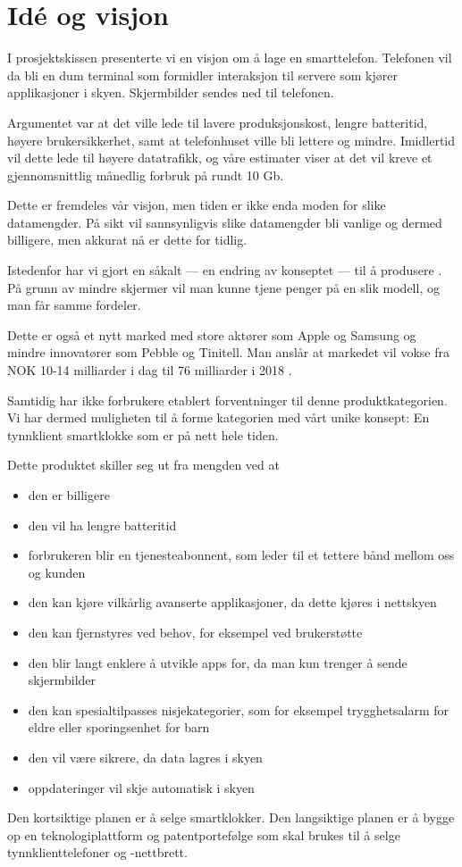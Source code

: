 \section{Idé og visjon}

I prosjektskissen presenterte vi en visjon om å lage en 
smarttelefon. Telefonen vil da bli en dum terminal som formidler interaksjon
til servere som kjører applikasjoner i skyen. Skjermbilder sendes ned til
telefonen.

Argumentet var at det ville lede til lavere produksjonskost, lengre
batteritid, høyere brukersikkerhet, samt at telefonhuset ville bli lettere og
mindre.  Imidlertid vil dette lede til høyere datatrafikk, og våre estimater
viser at det vil kreve et gjennomsnittlig månedlig forbruk på rundt 10 Gb.

Dette er fremdeles vår visjon, men tiden er ikke enda moden for slike
datamengder. På sikt vil sannsynligvis slike datamengder bli vanlige og dermed
billigere, men akkurat nå er dette for tidlig.

Istedenfor har vi gjort en såkalt  --- en endring av
konseptet --- til å produsere .  På grunn av
mindre skjermer vil man kunne tjene penger på en slik modell, og man får samme
fordeler.

Dette er også et nytt marked med store aktører som Apple og Samsung
og mindre innovatører som Pebble og Tinitell. Man anslår at markedet vil vokse
fra NOK 10-14 milliarder i dag til 76 milliarder i 2018 \cite{citi.grow}.

Samtidig har ikke forbrukere etablert forventninger til denne
produktkategorien. Vi har dermed muligheten til å forme kategorien med vårt
unike konsept: En tynnklient smartklokke som er på nett hele tiden.

Dette produktet skiller seg ut fra mengden ved at

\begin{itemize}
  \item den er billigere
  \item den vil ha lengre batteritid
  \item forbrukeren blir en tjenesteabonnent, som leder til et tettere bånd
  mellom oss og kunden
  \item den kan kjøre vilkårlig avanserte applikasjoner, da dette kjøres i
  nettskyen
  \item den kan fjernstyres ved behov, for eksempel ved brukerstøtte
  \item den blir langt enklere å utvikle apps for, da man kun trenger å sende
  skjermbilder
  \item den kan spesialtilpasses nisjekategorier, som for eksempel
  trygghetsalarm for eldre eller sporingsenhet for barn
  \item den vil være sikrere, da data lagres i skyen
  \item oppdateringer vil skje automatisk i skyen
\end{itemize}

Den kortsiktige planen er å selge smartklokker. Den langsiktige planen er å
bygge op en teknologiplattform og patentportefølge som skal brukes til å selge
tynnklienttelefoner og -nettbrett.

